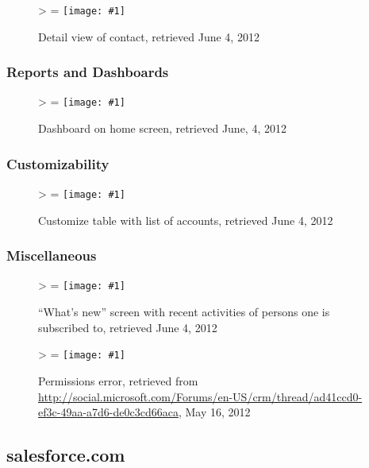 \documentclass[11pt,letterpaper]{article}
\newcommand{\downloadDate}{May 16, 2012}
\newlength{\imgwidth}
\newlength{\imgheight}
\newlength{\finalwidth}
\newlength{\finalheight}
\newlength{\imgtextheight}
\newcommand{\scalegraphics}[1]{%
	\settowidth{\imgwidth}{\texttt{[image: \#1]}}%
	\settoheight{\imgheight}{\texttt{[image: \#1]}}%
	\ifnum\imgwidth>\imgheight \def\imgangle{90} \else \def\imgangle{0} \fi%
	\setlength{\imgtextheight}{0.74\textheight}%
	\setlength{\finalwidth}{\minof{\imgwidth}{\textwidth}}%
	\setlength{\finalheight}{\minof{\imgheight}{\imgtextheight}}%
	\ifnum\finalwidth=\imgwidth \def\imgangle{0} \fi%
	\texttt{[image: \#1]}%
}
\begin{document}
\begin{figure}[htbp]
	\centering
	\scalegraphics{./img/dynamics/msft_contact_detail}
	\caption[Microsoft Dynamics CRM: Detail view of contact]{Detail view of contact, retrieved June 4, 2012}
\end{figure}

\newpage
\FloatBarrier
\subsubsection{Reports and Dashboards}
\begin{figure}[htbp]
	\centering
	\scalegraphics{./img/dynamics/msft_home_screen}
	\caption[Microsoft Dynamics CRM: Dashboard on home screen]{Dashboard on home screen, retrieved June, 4, 2012}
\end{figure}

\newpage
\FloatBarrier
\subsubsection{Customizability}
\begin{figure}[htbp]
	\centering
	\scalegraphics{./img/dynamics/msft_customize_table}
	\caption[Microsoft Dynamics CRM: Customize table with list of accounts]{Customize table with list of accounts, retrieved June 4, 2012}
\end{figure}

\newpage
\FloatBarrier
\subsubsection{Miscellaneous}
\begin{figure}[htbp]
	\centering
	\scalegraphics{./img/dynamics/msft_what's_new}
	\caption[Microsoft Dynamics CRM: ``What's new'' screen with recent activities of persons one is subscribed to]{``What's new'' screen with recent activities of persons one is subscribed to, retrieved June 4, 2012}
\end{figure}

\begin{figure}[htbp]
	\centering
	\scalegraphics{./img/dynamics/screen_msft_error}
	\caption[Microsoft Dynamics CRM: Permissions error]{Permissions error, retrieved from \url{http://social.microsoft.com/Forums/en-US/crm/thread/ad41ccd0-ef3c-49aa-a7d6-de0c3cd66aca}, \downloadDate}
\end{figure}

\FloatBarrier %
\newpage
\subsection{salesforce.com}
\end{document}

